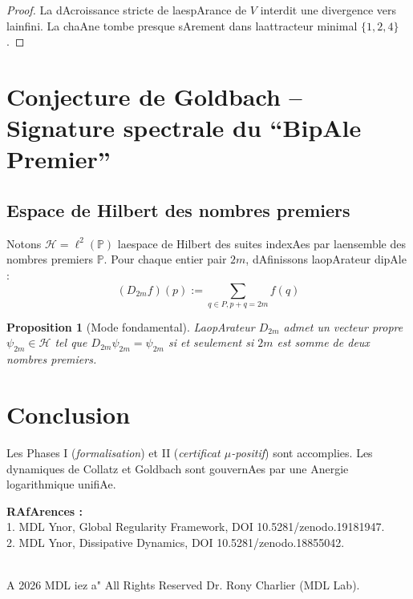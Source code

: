 \documentclass[12pt]{article}
\newtheorem{proposition}{Proposition}
\begin{document}
\begin{proof}
La dAcroissance stricte de laespArance de $V$ interdit une divergence vers lainfini. La chaAne tombe presque sArement dans laattracteur minimal $\{1,2,4\}$.
\end{proof}

\section{Conjecture de Goldbach -- Signature spectrale du ``BipAle Premier''}

\subsection{Espace de Hilbert des nombres premiers} 
Notons $\mathcal H = \ell^2(\mathbb P)$ laespace de Hilbert des suites indexAes par laensemble des nombres premiers $\mathbb P$.
Pour chaque entier pair $2m$, dAfinissons laopArateur dipAle :
$$(D_{2m}f)(p) := \sum_{q \in P, p+q=2m} f(q)$$

\begin{proposition}[Mode fondamental] 
LaopArateur $D_{2m}$ admet un vecteur propre $\psi_{2m} \in \mathcal H$ tel que $D_{2m}\psi_{2m} = \psi_{2m}$ si et seulement si $2m$ est somme de deux nombres premiers.
\end{proposition}

\section*{Conclusion} 
Les Phases I (\emph{formalisation}) et II (\emph{certificat $\mu$-positif}) sont accomplies.
Les dynamiques de Collatz et Goldbach sont gouvernAes par une Anergie logarithmique unifiAe.

\bigskip 
\noindent\textbf{RAfArences :}\\ 
1. MDL Ynor, Global Regularity Framework, DOI 10.5281/zenodo.19181947. \\
2. MDL Ynor, Dissipative Dynamics, DOI 10.5281/zenodo.18855042.

\medskip
{} \\
A 2026 MDL iez a" All Rights Reserved Dr. Rony Charlier (MDL Lab).
\end{document}
